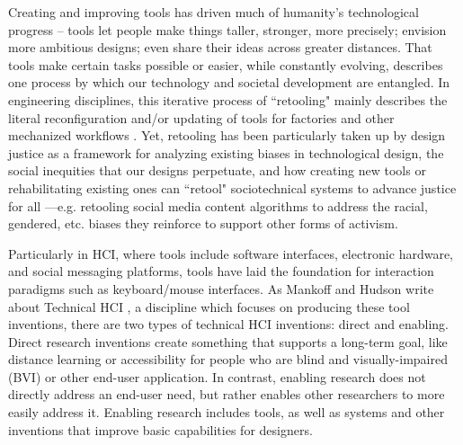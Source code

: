 Creating and improving tools has driven much of humanity's technological progress -- tools let people make things taller, stronger, more precisely; envision more ambitious designs; even share their ideas across greater distances. That tools make certain tasks possible or easier, while constantly evolving, describes one process by which our technology and societal development are entangled. In engineering disciplines, this iterative process of ``retooling" mainly describes the literal reconfiguration and/or updating of tools for factories and other mechanized workflows \cite{merriam-webster_retool_2023}. Yet, retooling has been particularly taken up by design justice as a framework for analyzing existing biases in technological design, the social inequities that our designs perpetuate, and how creating new tools or rehabilitating existing ones can ``retool" sociotechnical systems to advance justice for all \cite{costanza-chock_design_2020}---e.g. retooling social media content algorithms to address the racial, gendered, etc. biases they reinforce to support other forms of activism. 

Particularly in HCI, where tools include software interfaces, electronic hardware, and social messaging platforms, tools have laid the foundation for interaction paradigms such as keyboard/mouse interfaces. As Mankoff and Hudson write about Technical HCI , a discipline which focuses on producing these tool inventions, there are two types of technical HCI inventions: direct and enabling. Direct research inventions create something that supports a long-term goal, like distance learning or accessibility for people who are blind and visually-impaired (BVI) or other end-user application. In contrast, enabling research does not directly address an end-user need, but rather enables other researchers to more easily address it. Enabling research includes tools, as well as systems and other inventions that improve basic capabilities for designers.

